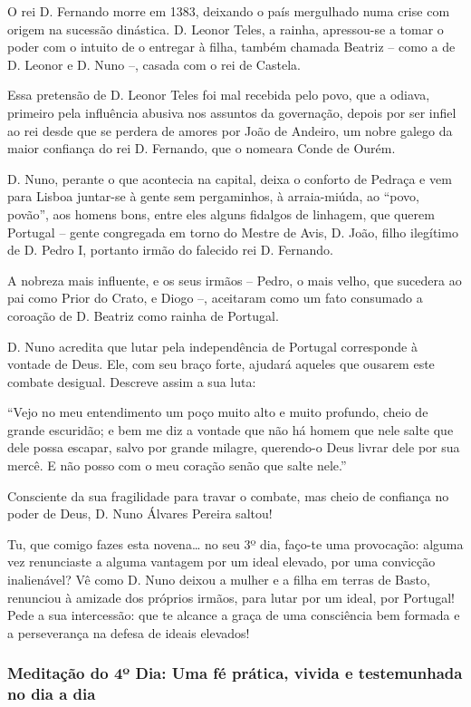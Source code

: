 \documentclass[a4paper,14pt]{extarticle} \usepackage[utf8]{inputenc}
\begin{document}
O rei D. Fernando morre em 1383, deixando o país mergulhado numa crise com origem na sucessão dinástica. D. Leonor Teles, a rainha, apressou-se a tomar o poder com o intuito de o entregar à filha, também chamada Beatriz – como a de D. Leonor e D. Nuno –, casada com o rei de Castela.

Essa pretensão de D. Leonor Teles foi mal recebida pelo povo, que a odiava, primeiro pela influência abusiva nos assuntos da governação, depois por ser infiel ao rei desde que se perdera de amores por João de Andeiro, um nobre galego da maior confiança do rei D. Fernando, que o nomeara Conde de Ourém.

D. Nuno, perante o que acontecia na capital, deixa o conforto de Pedraça e vem para Lisboa juntar-se à gente sem pergaminhos, à arraia-miúda, ao “povo, povão”, aos homens bons, entre eles alguns fidalgos de linhagem, que querem Portugal – gente congregada em torno do Mestre de Avis, D. João, filho ilegítimo de D. Pedro I, portanto irmão do falecido rei D. Fernando.

A nobreza mais influente, e os seus irmãos – Pedro, o mais velho, que sucedera ao pai como Prior do Crato, e Diogo –, aceitaram como um fato consumado a coroação de D. Beatriz como rainha de Portugal.

D. Nuno acredita que lutar pela independência de Portugal corresponde à vontade de Deus. Ele, com seu braço forte, ajudará aqueles que ousarem este combate desigual. Descreve assim a sua luta:

“Vejo no meu entendimento um poço muito alto e muito profundo, cheio de grande escuridão; e bem me diz a vontade que não há homem que nele salte que dele possa escapar, salvo por grande milagre, querendo-o Deus livrar dele por sua mercê. E não posso com o meu coração senão que salte nele.”

Consciente da sua fragilidade para travar o combate, mas cheio de confiança no poder de Deus, D. Nuno Álvares Pereira saltou!

Tu, que comigo fazes esta novena… no seu 3º dia, faço-te uma provocação: alguma vez renunciaste a alguma vantagem por um ideal elevado, por uma convicção inalienável? Vê como D. Nuno deixou a mulher e a filha em terras de Basto, renunciou à amizade dos próprios irmãos, para lutar por um ideal, por Portugal! Pede a sua intercessão: que te alcance a graça de uma consciência bem formada e a perseverança na defesa de ideais elevados!


\subsubsection{Meditação do 4º Dia: Uma fé prática, vivida e testemunhada no dia a dia}
\end{document}
